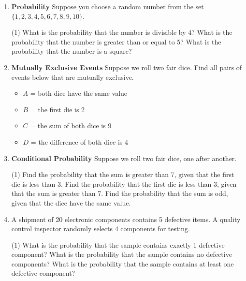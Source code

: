 \begin{enumerate}

\item \textbf{Probability} Suppose you choose a random number from the set $\{1,2,3,4,5,6,7,8,9,10\}$.
\begin{tasks}[after-skip = 40pt, after-item-skip=30pt](1)
\task What is the probability that the number is divisible by 4?
\task What is the probability that the number is greater than or equal to 5?
\task What is the probability that the number is a square?
\end{tasks}

\item \textbf{Mutually Exclusive Events} Suppose we roll two fair dice. Find all pairs of events below that are mutually exclusive.
\begin{itemize}
\item $A$ = both dice have the same value
\item $B$ = the first die is 2
\item $C$ = the sum of both dice is 9
\item $D$ = the difference of both dice is 4
\end{itemize}
\vspace{40pt}

\item \textbf{Conditional Probability} Suppose we roll two fair dice, one after another.
\begin{tasks}[after-skip = 40pt, after-item-skip=35pt](1)
\task Find the probability that the sum is greater than 7, given that the first die is less than 3.
\task Find the probability that the first die is less than 3, given that the sum is greater than 7.
\task Find the probability that the sum is odd, given that the dice have the same value.
\end{tasks}

\newpage

\item A shipment of 20 electronic components contains 5 defective items. A quality control inspector randomly selects 4 components for testing. 
\begin{tasks}[after-skip = 40pt, after-item-skip=25pt](1)
\task What is the probability that the sample contains exactly 1 defective component?
\task What is the probability that the sample contains no defective components?
\task What is the probability that the sample contains at least one defective component?
\end{tasks}


\end{enumerate}
